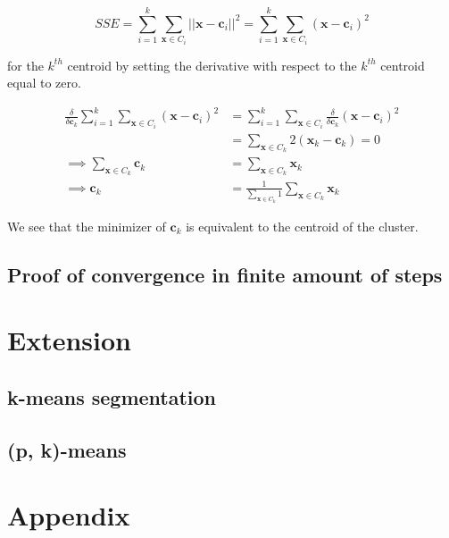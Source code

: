 \documentclass[11pt]{article}
\begin{document}
    \begin{equation}
        SSE = \sum_{i=1}^k \sum_{\mathbf{x} \in C_i} ||\mathbf{x} - \mathbf{c}_i||^2 
        = \sum_{i=1}^k \sum_{\mathbf{x} \in C_i} (\mathbf{x} - \mathbf{c}_i)^2
    \end{equation}
    
    for the $k^{th}$ centroid by setting the derivative with respect to the $k^{th}$ centroid equal to zero.
    
    \begin{equation}
    \begin{split}
        \frac{\delta}{\delta \mathbf{c}_k} \sum_{i=1}^k \sum_{\mathbf{x} \in C_i} (\mathbf{x} - \mathbf{c}_i)^2
        &= \sum_{i=1}^k \sum_{\mathbf{x} \in C_i}  \frac{\delta}{\delta \mathbf{c}_k} (\mathbf{x} - \mathbf{c}_i)^2\\
        &= \sum_{\mathbf{x} \in C_k} 2(\mathbf{x}_k - \mathbf{c}_k) = 0\\
        \implies \sum_{\mathbf{x} \in C_k} \mathbf{c}_k &= \sum_{\mathbf{x} \in C_k} \mathbf{x}_k\\
        \implies \mathbf{c}_k &= \frac{1}{\sum_{\mathbf{x} \in C_k} 1} \sum_{\mathbf{x} \in C_k} \mathbf{x}_k
    \end{split}
    \end{equation}
    
    We see that the minimizer of $\mathbf{c}_k$ is equivalent to the centroid of the cluster.
    
\subsection{Proof of convergence in finite amount of steps}

\section{Extension}
\subsection{k-means segmentation}

\subsection{(p, k)-means}

\section{Appendix}
\end{document}

